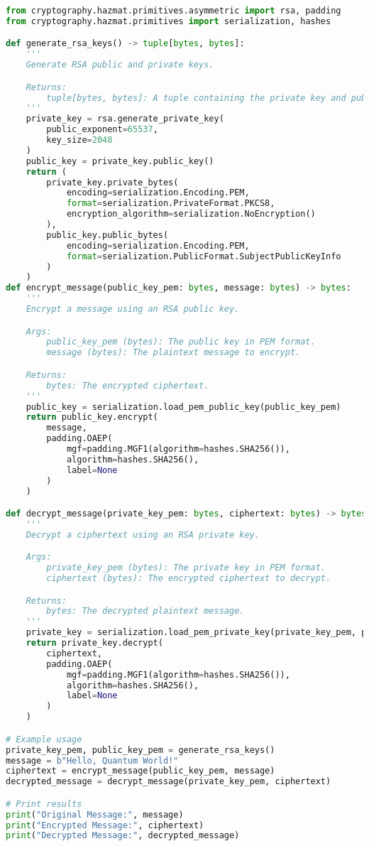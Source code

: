 \documentclass[12pt,a4paper]{report}
\begin{document}
\begin{lstlisting}[language=Python, caption=Python code for RSA encryption and decryption, label={lst:rsa_example}]
from cryptography.hazmat.primitives.asymmetric import rsa, padding
from cryptography.hazmat.primitives import serialization, hashes

def generate_rsa_keys() -> tuple[bytes, bytes]:
    '''
    Generate RSA public and private keys.

    Returns:
        tuple[bytes, bytes]: A tuple containing the private key and public key in PEM format.
    '''
    private_key = rsa.generate_private_key(
        public_exponent=65537,
        key_size=2048
    )
    public_key = private_key.public_key()
    return (
        private_key.private_bytes(
            encoding=serialization.Encoding.PEM,
            format=serialization.PrivateFormat.PKCS8,
            encryption_algorithm=serialization.NoEncryption()
        ),
        public_key.public_bytes(
            encoding=serialization.Encoding.PEM,
            format=serialization.PublicFormat.SubjectPublicKeyInfo
        )
    )
def encrypt_message(public_key_pem: bytes, message: bytes) -> bytes:
    '''
    Encrypt a message using an RSA public key.

    Args:
        public_key_pem (bytes): The public key in PEM format.
        message (bytes): The plaintext message to encrypt.

    Returns:
        bytes: The encrypted ciphertext.
    '''
    public_key = serialization.load_pem_public_key(public_key_pem)
    return public_key.encrypt(
        message,
        padding.OAEP(
            mgf=padding.MGF1(algorithm=hashes.SHA256()),
            algorithm=hashes.SHA256(),
            label=None
        )
    )

def decrypt_message(private_key_pem: bytes, ciphertext: bytes) -> bytes:
    '''
    Decrypt a ciphertext using an RSA private key.

    Args:
        private_key_pem (bytes): The private key in PEM format.
        ciphertext (bytes): The encrypted ciphertext to decrypt.

    Returns:
        bytes: The decrypted plaintext message.
    '''
    private_key = serialization.load_pem_private_key(private_key_pem, password=None)
    return private_key.decrypt(
        ciphertext,
        padding.OAEP(
            mgf=padding.MGF1(algorithm=hashes.SHA256()),
            algorithm=hashes.SHA256(),
            label=None
        )
    )

# Example usage
private_key_pem, public_key_pem = generate_rsa_keys()
message = b"Hello, Quantum World!"
ciphertext = encrypt_message(public_key_pem, message)
decrypted_message = decrypt_message(private_key_pem, ciphertext)

# Print results
print("Original Message:", message)
print("Encrypted Message:", ciphertext)
print("Decrypted Message:", decrypted_message)
\end{lstlisting}
\end{document}
